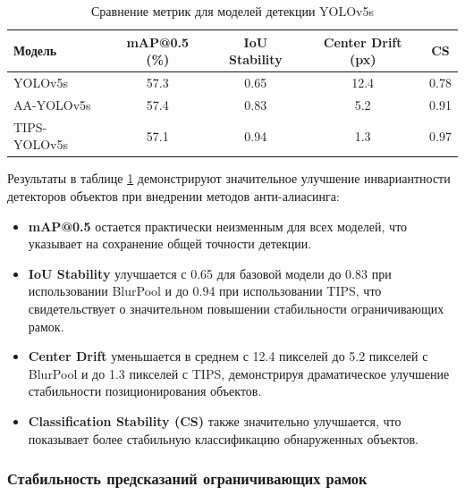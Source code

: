 \begin{table}[ht]
\centering
\caption{Сравнение метрик для моделей детекции YOLOv5s}
\label{tab:detection_metrics}
\begin{tabular}{|l|c|c|c|c|}
\hline
\textbf{Модель} & \textbf{mAP@0.5 (\%)} & \textbf{IoU Stability} & \textbf{Center Drift (px)} & \textbf{CS} \\ \hline
YOLOv5s & 57.3 & 0.65 & 12.4 & 0.78 \\ \hline
AA-YOLOv5s & 57.4 & 0.83 & 5.2 & 0.91 \\ \hline
TIPS-YOLOv5s & 57.1 & 0.94 & 1.3 & 0.97 \\ \hline
\end{tabular}
\end{table}

Результаты в таблице \ref{tab:detection_metrics} демонстрируют значительное улучшение инвариантности детекторов объектов при внедрении методов анти-алиасинга:

\begin{itemize}
    \item \textbf{mAP@0.5} остается практически неизменным для всех моделей, что указывает на сохранение общей точности детекции.
    
    \item \textbf{IoU Stability} улучшается с 0.65 для базовой модели до 0.83 при использовании BlurPool и до 0.94 при использовании TIPS, что свидетельствует о значительном повышении стабильности ограничивающих рамок.
    
    \item \textbf{Center Drift} уменьшается в среднем с 12.4 пикселей до 5.2 пикселей с BlurPool и до 1.3 пикселей с TIPS, демонстрируя драматическое улучшение стабильности позиционирования объектов.
    
    \item \textbf{Classification Stability (CS)} также значительно улучшается, что показывает более стабильную классификацию обнаруженных объектов.
\end{itemize}

\subsubsection{Стабильность предсказаний ограничивающих рамок}
\label{sec:experiments:detection:bbox}

